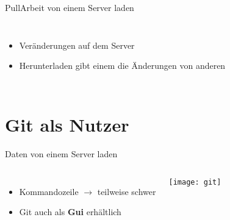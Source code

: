\documentclass[xcolor=dvipsnames]{beamer}
\begin{document}
      \begin{frame}{Pull}{Arbeit von einem Server laden}
        \begin{columns}
          \begin{itemize}[<+->]
            \item Veränderungen auf dem Server
            \item Herunterladen gibt einem die Änderungen von anderen
          \end{itemize}
        \end{columns}
      \end{frame}

    \section{Git als Nutzer}

      \begin{frame}{Daten von einem Server laden}
        \begin{columns}
            \begin{itemize}[<+->]
              \item Kommandozeile $\rightarrow$ teilweise schwer
              \item Git auch als \textbf{Gui} erhältlich
            \end{itemize}

            \texttt{[image: git]}
        \end{columns}
      \end{frame}
\end{document}
